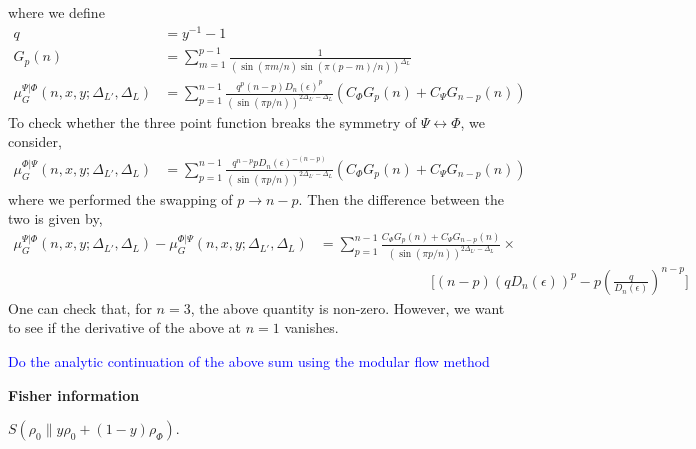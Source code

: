 \documentclass[11pt]{article}
\newcommand{\ep}{\epsilon}
\newcommand{\nn}{\nonumber}
\newcommand{\lb}{\left(}
\newcommand{\rb}{\right)}
\newcommand{\NL}[1]{\textcolor{blue}{#1}}
\begin{document}
where we define
\begin{align}
    q &= y^{-1}-1 \\
    G_p(n) &= \sum_{m=1}^{p-1} \frac{1}{\lb \sin(\pi m/n) \sin(\pi (p-m)/n)\rb^{\Delta_L}}\\
    \mu_G^{\Psi|\Phi} (n,x,y;\Delta_{L'},\Delta_L) &= \sum_{p=1}^{n-1}   \frac{q^p (n-p)D_n(\ep)^{p}}{\lb \sin(\pi p/n)\rb^{2\Delta_{L'}-\Delta_L}} \lb C_\Phi G_p(n) + C_\Psi G_{n-p}(n)\rb
\end{align}
To check whether the three point function breaks the symmetry of $\Psi \leftrightarrow \Phi$, we consider,
\begin{align}
    \mu_G^{\Phi|\Psi}(n,x,y;\Delta_{L'},\Delta_L) &= \sum_{p=1}^{n-1}\frac{q^{n-p} p D_n(\ep)^{-(n-p)}}{\lb\sin(\pi p/n)\rb^{2\Delta_{L'}-\Delta_L}}\lb C_\Phi G_{p}(n) + C_\Psi G_{n-p}(n) \rb
\end{align}
where we performed the swapping of $p \to n-p$. Then the difference between the two is given by,
\begin{align}
    \mu_G^{\Psi|\Phi} (n,x,y;\Delta_{L'},\Delta_L) - \mu_G^{\Phi|\Psi} (n,x,y;\Delta_{L'},\Delta_L) &=\sum_{p=1}^{n-1}\frac{C_\Phi G_p(n) + C_\Psi G_{n-p}(n)}{\lb\sin(\pi p/n)\rb^{2\Delta_{L'}-\Delta_L}}\times\nn\\
    &\qquad\qquad\qquad\qquad\Bigg[(n-p) \lb qD_n(\ep)\rb^p - p\lb\frac{q}{D_n(\ep)}\rb^{n-p}\Bigg]
\end{align}
One can check that, for $n=3$, the above quantity is non-zero. 
However, we want to see if the derivative of the above at $n=1$ vanishes. 

\NL{Do the analytic continuation of the above sum using the modular flow method}


\textbf{Fisher information}

$S(\rho_0 \| y\rho_0 + (1-y)\rho_\Phi)$. 
\end{document}
